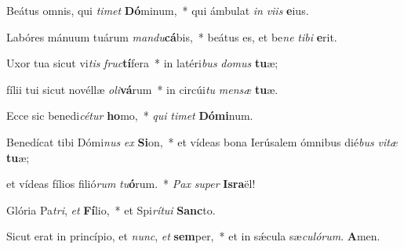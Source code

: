 \item Beátus omnis, qui \textit{timet} \textbf{Dó}minum,~* qui ámbulat \textit{in} \textit{viis} \textbf{e}ius.

\item Labóres mánuum tuárum \textit{mandu}\textbf{cá}bis,~* beátus es, et be\textit{ne} \textit{tibi} \textbf{e}rit.

\item Uxor tua sicut vi\textit{tis} \textit{fruc}\textbf{tí}fera~* in latéri\textit{bus} \textit{domus} \textbf{tu}æ;

\item fílii tui sicut novéllæ \textit{oli}\textbf{vá}rum~* in circúi\textit{tu} \textit{mensæ} \textbf{tu}æ.

\item Ecce sic benedi\textit{cétur} \textbf{ho}mo,~* \textit{qui} \textit{timet} \textbf{Dó}\textbf{mi}num.

\item Benedícat tibi Dómi\textit{nus} \textit{ex} \textbf{Si}on,~* et vídeas bona Ierúsalem ómnibus dié\textit{bus} \textit{vitæ} \textbf{tu}æ;

\item et vídeas fílios filió\textit{rum} \textit{tu}\textbf{ó}rum.~* \textit{Pax} \textit{super} \textbf{Is}\textbf{ra}ël!

\item Glória Pa\textit{tri}, \textit{et} \textbf{Fí}lio,~* et Spi\textit{rítui} \textbf{Sanc}to.

\item Sicut erat in princípio, et \textit{nunc}, \textit{et} \textbf{sem}per,~* et in sǽcula sæ\textit{culórum}. \textbf{A}men.